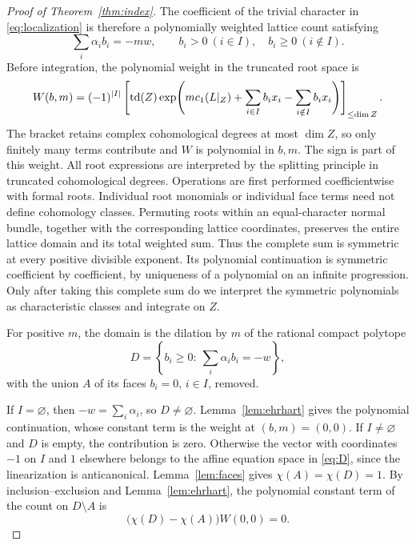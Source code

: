 \begin{proof}[Proof of Theorem~\ref{thm:index}]
The coefficient of the trivial character in \eqref{eq:localization}
is therefore a polynomially weighted lattice count satisfying
\[
\sum_i\alpha_i b_i=-mw,\qquad
b_i>0\ (i\in I),\quad b_i\ge0\ (i\notin I).
\]
Before integration, the polynomial weight in the truncated root space is
\begin{equation}\label{eq:lattice-weight}
W(b,m)=(-1)^{|I|}\left[
\operatorname{td}(Z)\exp\!\left(m c_1(L|_Z)
 +\sum_{i\in I}b_i x_i-\sum_{i\notin I}b_i x_i\right)
\right]_{\le\dim Z}.
\end{equation}
The bracket retains complex cohomological degrees at most \(\dim Z\),
so only finitely many terms contribute and \(W\) is polynomial in
\(b,m\). The sign is part of this weight.
All root expressions are interpreted by the splitting principle in
truncated cohomological degrees. Operations are first performed
coefficientwise with formal roots. Individual root monomials or
individual face terms need not define cohomology classes. Permuting
roots within an equal-character normal bundle, together with the
corresponding lattice coordinates, preserves the entire lattice domain
and its total weighted sum. Thus the complete sum is symmetric at
every positive divisible exponent. Its polynomial continuation is
symmetric coefficient by coefficient, by uniqueness of a polynomial
on an infinite progression. Only after taking this complete sum do we
interpret the symmetric polynomials as characteristic classes and
integrate on \(Z\).

For positive \(m\), the domain is the dilation by \(m\) of the rational
compact polytope
\begin{equation}\label{eq:D}
D=\left\{b_i\ge0:\ \sum_i\alpha_i b_i=-w\right\},
\end{equation}
with the union \(A\) of its faces \(b_i=0\), \(i\in I\), removed.

If \(I=\varnothing\), then \(-w=\sum_i\alpha_i\), so \(D\ne\varnothing\).
Lemma~\ref{lem:ehrhart} gives the polynomial continuation, whose
constant term is the weight at \((b,m)=(0,0)\).
If \(I\ne\varnothing\) and \(D\) is empty, the contribution is zero.
Otherwise the vector with coordinates \(-1\) on \(I\) and \(1\)
elsewhere belongs to the affine equation space in \eqref{eq:D},
since the linearization is anticanonical.
Lemma~\ref{lem:faces} gives \(\chi(A)=\chi(D)=1\).
By inclusion--exclusion and Lemma~\ref{lem:ehrhart}, the polynomial
constant term of the count on \(D\setminus A\) is
\[
\bigl(\chi(D)-\chi(A)\bigr)W(0,0)=0.
\]


\end{proof}
